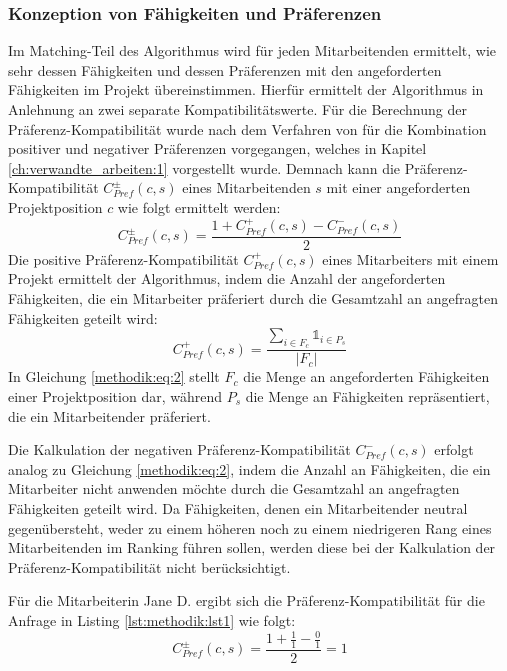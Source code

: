 \subsubsection{Konzeption von Fähigkeiten und Präferenzen}
Im Matching-Teil des Algorithmus wird für jeden Mitarbeitenden ermittelt, wie sehr dessen Fähigkeiten und dessen Präferenzen mit den angeforderten Fähigkeiten im Projekt übereinstimmen.
Hierfür ermittelt der Algorithmus in Anlehnung an \textcite[S. 207ff.]{pizzato:2010} zwei separate Kompatibilitätswerte.
Für die Berechnung der Präferenz-Kompatibilität wurde nach dem Verfahren von \textcite[S. 269ff.]{pizzato:2:inproceedings} für die Kombination positiver und negativer Präferenzen vorgegangen, welches in Kapitel \ref{ch:verwandte_arbeiten:1} vorgestellt wurde.
Demnach kann die Präferenz-Kompatibilität $C_{Pref}^{\pm}(c,s)$ eines Mitarbeitenden $s$ mit einer angeforderten Projektposition $c$ wie folgt ermittelt werden:
\begin{equation}\label{methodik:eq:1}
    C_{Pref}^{\pm}(c,s)=\frac{1+C_{Pref}^{+}(c,s)-C_{Pref}^{-}(c,s)}{2}
\end{equation}
Die positive Präferenz-Kompatibilität $C_{Pref}^{+}(c,s)$ eines Mitarbeiters mit einem Projekt ermittelt der Algorithmus, indem die Anzahl der angeforderten Fähigkeiten, die ein Mitarbeiter präferiert durch die Gesamtzahl an angefragten Fähigkeiten geteilt wird:
\begin{equation}\label{methodik:eq:2}
    C_{Pref}^{+}(c,s)=\frac{\sum\limits_{i \in F_{c}} \mathbb{1}_{i \in P_{s}}}{|F_{c}|}
\end{equation}
In Gleichung \ref{methodik:eq:2} stellt $F_{c}$ die Menge an angeforderten Fähigkeiten einer Projektposition dar, während $P_{s}$ die Menge an Fähigkeiten repräsentiert, die ein Mitarbeitender präferiert.

Die Kalkulation der negativen Präferenz-Kompatibilität $C_{Pref}^{-}(c,s)$ erfolgt analog zu Gleichung \ref{methodik:eq:2}, indem die Anzahl an Fähigkeiten, die ein Mitarbeiter nicht anwenden möchte durch die Gesamtzahl an angefragten Fähigkeiten geteilt wird.
Da Fähigkeiten, denen ein Mitarbeitender neutral gegenübersteht, weder zu einem höheren noch zu einem niedrigeren Rang eines Mitarbeitenden im Ranking führen sollen, werden diese bei der Kalkulation der Präferenz-Kompatibilität nicht berücksichtigt.

Für die Mitarbeiterin Jane D. ergibt sich die Präferenz-Kompatibilität für die Anfrage in Listing \ref{lst:methodik:lst1} wie folgt:
\begin{equation}\label{methodik:eq:4}
    C_{Pref}^{\pm}(c,s) = \frac{1+\frac{1}{1}-\frac{0}{1}}{2} = 1
\end{equation}

